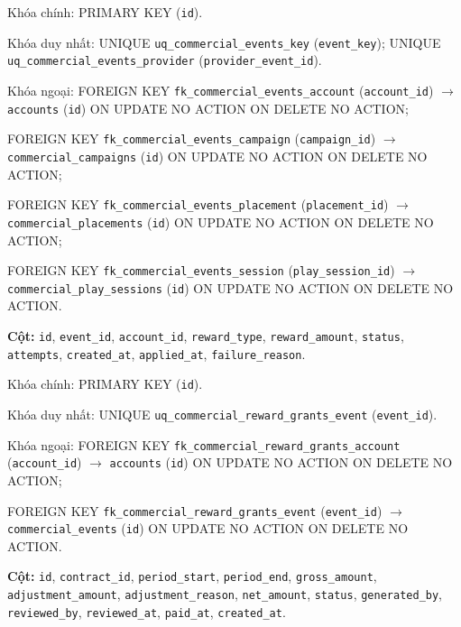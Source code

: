 \begin{description}[leftmargin=3.6cm,labelwidth=3.4cm,style=nextline]
Khóa chính: PRIMARY KEY (\texttt{id}).

Khóa duy nhất: UNIQUE \texttt{uq\_commercial\_events\_key} (\texttt{event\_key}); UNIQUE \texttt{uq\_commercial\_events\_provider} (\texttt{provider\_event\_id}).

Khóa ngoại: FOREIGN KEY \texttt{fk\_commercial\_events\_account} (\texttt{account\_id}) $\rightarrow$ \texttt{accounts} (\texttt{id}) ON UPDATE NO ACTION ON DELETE NO ACTION;\par FOREIGN KEY \texttt{fk\_commercial\_events\_campaign} (\texttt{campaign\_id}) $\rightarrow$ \texttt{commercial\_campaigns} (\texttt{id}) ON UPDATE NO ACTION ON DELETE NO ACTION;\par FOREIGN KEY \texttt{fk\_commercial\_events\_placement} (\texttt{placement\_id}) $\rightarrow$ \texttt{commercial\_placements} (\texttt{id}) ON UPDATE NO ACTION ON DELETE NO ACTION;\par FOREIGN KEY \texttt{fk\_commercial\_events\_session} (\texttt{play\_session\_id}) $\rightarrow$ \texttt{commercial\_play\_sessions} (\texttt{id}) ON UPDATE NO ACTION ON DELETE NO ACTION.

\item[\texttt{commercial\_reward\_grants}] \textbf{Cột:} \texttt{id}, \texttt{event\_id}, \texttt{account\_id}, \texttt{reward\_type}, \texttt{reward\_amount}, \texttt{status}, \texttt{attempts}, \texttt{created\_at}, \texttt{applied\_at}, \texttt{failure\_reason}.

Khóa chính: PRIMARY KEY (\texttt{id}).

Khóa duy nhất: UNIQUE \texttt{uq\_commercial\_reward\_grants\_event} (\texttt{event\_id}).

Khóa ngoại: FOREIGN KEY \texttt{fk\_commercial\_reward\_grants\_account} (\texttt{account\_id}) $\rightarrow$ \texttt{accounts} (\texttt{id}) ON UPDATE NO ACTION ON DELETE NO ACTION;\par FOREIGN KEY \texttt{fk\_commercial\_reward\_grants\_event} (\texttt{event\_id}) $\rightarrow$ \texttt{commercial\_events} (\texttt{id}) ON UPDATE NO ACTION ON DELETE NO ACTION.

\item[\texttt{commercial\_settlements}] \textbf{Cột:} \texttt{id}, \texttt{contract\_id}, \texttt{period\_start}, \texttt{period\_end}, \texttt{gross\_amount}, \texttt{adjustment\_amount}, \texttt{adjustment\_reason}, \texttt{net\_amount}, \texttt{status}, \texttt{generated\_by}, \texttt{reviewed\_by}, \texttt{reviewed\_at}, \texttt{paid\_at}, \texttt{created\_at}.


\end{description}
